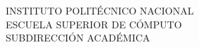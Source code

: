 
\begin{minipage}[b]{.2\textwidth}
\end{minipage}
\begin{minipage}{.6\textwidth}

  \begin{center}

        \large{INSTITUTO} \large{POLITÉCNICO} \large{NACIONAL}\\
        \large{ESCUELA} \large{SUPERIOR} \large{DE} \large{CÓMPUTO}\\
        \large{SUBDIRECCIÓN} \large{ACADÉMICA}

  \end{center}



\end{minipage}
\begin{minipage}[b]{.2\textwidth}
\end{minipage}

